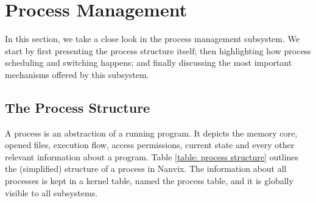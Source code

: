 \documentclass[10pt,a4paper]{article}
\begin{document}
\section{Process Management}

In this section, we take a close look in the process management subsystem. We start by first presenting the process structure itself; then highlighting how process scheduling and switching happens; and finally discussing the most important mechanisms offered by this subsystem.

\subsection{The Process Structure}
\label{subsection: the process structure}

A process is an abstraction of a running program. It depicts the memory core, opened files, execution flow, access permissions, current state and every other relevant information about a program. Table \ref{table: process structure} outlines the (simplified) structure of a process in Nanvix. The information about all processes is kept in a kernel table, named the process table, and it is globally visible to all subsystems.
\end{document}
